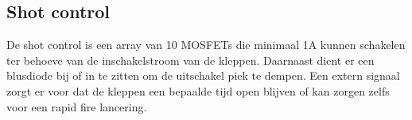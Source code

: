 \subsection{Shot control}

De shot control is een array van 10 MOSFETs die minimaal 1A kunnen schakelen ter behoeve
van de inschakelstroom van de kleppen. Daarnaast dient er een blusdiode bij of in te
zitten om de uitschakel piek te dempen. Een extern signaal zorgt er voor dat de kleppen
een bepaalde tijd open blijven of kan zorgen zelfs voor een rapid fire lancering.

